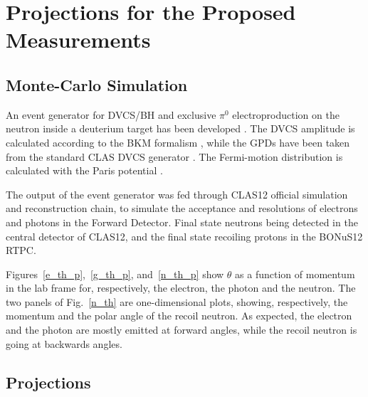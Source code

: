 \chapter{Projections for the Proposed Measurements}
\label{chap:reach}

\section{Monte-Carlo Simulation}
An event generator for DVCS/BH and exclusive $\pi^0$ electroproduction on the 
neutron inside a deuterium target has been developed \cite{ahmed}. The DVCS 
amplitude is calculated according to the BKM formalism \cite{Belitsky:2001ns}, 
while the GPDs have been taken from the standard CLAS DVCS generator 
\cite{PhysRevD.60.094017,Guidal:2004nd}.  The Fermi-motion distribution is 
calculated with the Paris potential \cite{PhysRevC.21.861}.

The output of the event generator was fed through CLAS12 official simulation 
and reconstruction chain, to simulate the acceptance and resolutions of 
electrons and photons in the Forward Detector. Final state neutrons being 
detected in the central detector of CLAS12, and the final state recoiling 
protons in the BONuS12 RTPC. 

Figures~\ref{e_th_p},~\ref{g_th_p}, and~\ref{n_th_p} show $\theta$ as a 
function of momentum in the lab frame for, respectively, the electron, the 
photon and the neutron. The two panels of Fig.~\ref{n_th} are one-dimensional 
plots, showing, respectively, the momentum and the polar angle of the recoil 
neutron. As expected, the electron and the photon are mostly emitted at forward 
angles, while the recoil neutron is going at backwards angles.




\section{Projections}


